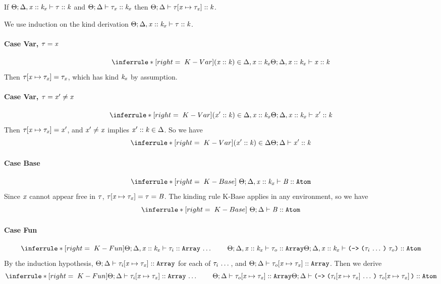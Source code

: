\newcommand{\typesubst}[1]{\subst{#1}{\var}{\type_\var}}
\begin{lemma}
  \label{TTSub}
  If $\Theta;\Delta,\mathit{x} :: \mathit{k}_{\mathit{x}} \vdash \mathit{\tau} :: \mathit{k}$
  and $\Theta;\Delta \vdash \mathit{\tau}_{\mathit{x}} :: \mathit{k}_{\mathit{x}}$
  then $\kindof{\sEnv}{\kEnv}{\typesubst{\type}}{\kind}$.
\end{lemma}
\begin{sproof}
  We use induction on the kind derivation
  $\Theta;\Delta,\mathit{x} :: \mathit{k}_{\mathit{x}} \vdash \mathit{\tau} :: \mathit{k}$.
  \paragraph{Case {\sc Var}, $\mathit{\tau} = \mathit{x}$}
  \[\infr[K-Var]
  {\parens{\haskind{\var}{\kind}} \in \kEnv, \haskind{\var}{\kind_\var}}
  {\kindof{\sEnv}{\kEnv, \haskind{\var}{\kind_\var}}{\var}{\kind}}\]
  Then $\typesubst{\type} = \type_\var$,
  which has kind $\mathit{k}_{\mathit{x}}$ by assumption.

  \paragraph{Case {\sc Var}, $\mathit{\tau} = \mathit{x}' \not= \mathit{x}$}
  \[\infr[K-Var]
  {\parens{\haskind{\var'}{\kind}} \in \kEnv, \haskind{\var}{\kind_\var}}
  {\kindof{\sEnv}{\kEnv, \haskind{\var}{\kind_\var}}{\var'}{\kind}}\]
  Then $\typesubst{\type} = \var'$,
  and $\mathit{x}' \not= \mathit{x}$ implies $\mathit{x}' :: \mathit{k} \in \Delta$.
  So we have
  \[\infr[K-Var]
  {\parens{\haskind{\var'}{\kind}} \in \kEnv}
  {\kindof{\sEnv}{\kEnv}{\var'}{\kind}}\]

  \paragraph{Case {\sc Base}}
  \[\infr[K-Base]
  {\ }{\kindof{\sEnv}{\kEnv, \haskind{\var}{\kind_\var}}{\basetype}{\kindatom}}\]
  Since $\mathit{x}$ cannot appear free in $\mathit{\tau}$,
  $\typesubst{\type} = \type = \basetype$.
  The kinding rule {\sc K-Base} applies in any environment,
  so we have
  \[\infr[K-Base]{\ }{\kindof{\sEnv}{\kEnv}{\basetype}{\kindatom}}\]

  \paragraph{Case {\sc Fun}}
  \[\infr[K-Fun]
  {\sequence{\kindof{\sEnv}{\kEnv, \haskind{\var}{\kind_\var}}{\type_i}{\kindarray}}
    \qquad
  \kindof{\sEnv}{\kEnv, \haskind{\var}{\kind_\var}}{\type_o}{\kindarray}}
  {\kindof{\sEnv}{\kEnv, \haskind{\var}{\kind_\var}}{\typefun{\sequence{\type_i}}{\type_o}}{\kindatom}}\]
  By the induction hypothesis,
  $\kindof{\sEnv}{\kEnv}{\typesubst{\type_i}}{\kindarray}$
  for each of $\mathit{\tau}_i \, \ldots \,$,
  and $\kindof{\sEnv}{\kEnv}{\typesubst{\type_o}}{\kindarray}$.
  Then we derive
  \[\infr[K-Fun]
  {\sequence{\kindof{\sEnv}{\kEnv}
      {\typesubst{\type_i}}
      {\kindarray}}
    \qquad \kindof{\sEnv}{\kEnv}
    {\typesubst{\type_o}}
    {\kindarray}}
  {\kindof
    {\sEnv}{\kEnv}
    {\typefun{\sequence{\typesubst{\type_i}}}{\typesubst{\type_o}}}
    {\kindatom}}\]


\end{sproof}
